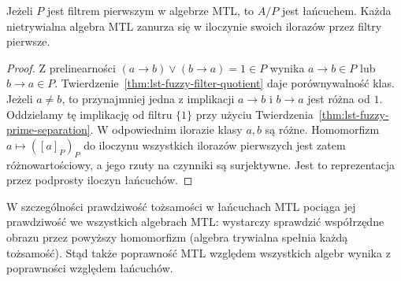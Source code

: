 \begin{wniosek}
\label{cor:lst-fuzzy-chain-quotient}
Jeżeli $P$ jest filtrem pierwszym w algebrze MTL, to $A/P$
jest łańcuchem. Każda nietrywialna algebra MTL zanurza się
w iloczynie swoich ilorazów przez filtry pierwsze.
\end{wniosek}
\begin{proof}
Z prelinearności $(a\to b)\vee(b\to a)=1\in P$ wynika
$a\to b\in P$ lub $b\to a\in P$.
Twierdzenie~\ref{thm:lst-fuzzy-filter-quotient} daje porównywalność klas.
Jeżeli $a\ne b$, to przynajmniej jedna z implikacji $a\to b$
i $b\to a$ jest różna od $1$. Oddzielamy tę implikację
od filtru $\{1\}$ przy użyciu
Twierdzenia~\ref{thm:lst-fuzzy-prime-separation}.
W odpowiednim ilorazie klasy $a,b$ są różne. Homomorfizm
$a\mapsto([a]_P)_P$ do iloczynu wszystkich ilorazów pierwszych
jest zatem różnowartościowy, a jego rzuty na czynniki są
surjektywne. Jest to reprezentacja przez podprosty iloczyn
łańcuchów.
\end{proof}
W szczególności prawdziwość tożsamości w łańcuchach MTL
pociąga jej prawdziwość we wszystkich algebrach MTL:
wystarczy sprawdzić współrzędne obrazu przez powyższy homomorfizm
(algebra trywialna spełnia każdą tożsamość).
Stąd także poprawność MTL względem wszystkich algebr wynika
z poprawności względem łańcuchów.

